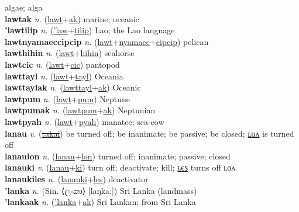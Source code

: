 algae; alga \label{lawtalkas} \\
\textbf{lawtak} \textit{n.} (\hyperref[lawt]{lawt}+\hyperref[ak]{ak})
marine; oceanic \label{lawtak} \\
\textbf{'lawtilip} \textit{n.} (\hyperref['law]{'law}+\hyperref[tilip]{tilip})
Lao; the Lao language \label{'lawtilip} \\
\textbf{lawtnyamaeccipcip} \textit{n.} (\hyperref[lawt]{lawt}+\hyperref[nyamaec]{nyamaec}+\hyperref[cipcip]{cipcip})
pelican \label{lawtnyamaeccipcip} \\
\textbf{lawthihin} \textit{n.} (\hyperref[lawt]{lawt}+\hyperref[hihin]{hihin})
seahorse \label{lawthihin} \\
\textbf{lawtcic} \textit{n.} (\hyperref[lawt]{lawt}+\hyperref[cic]{cic})
pantopod \label{lawtcic} \\
\textbf{lawttayl} \textit{n.} (\hyperref[lawt]{lawt}+\hyperref[tayl]{tayl})
Oceania \label{lawttayl} \\
\textbf{lawttaylak} \textit{n.} (\hyperref[lawttayl]{lawttayl}+\hyperref[ak]{ak})
Oceanic \label{lawttaylak} \\
\textbf{lawtpum} \textit{n.} (\hyperref[lawt]{lawt}+\hyperref[pum]{pum})
Neptune \label{lawtpum} \\
\textbf{lawtpumak} \textit{n.} (\hyperref[lawtpum]{lawtpum}+\hyperref[ak]{ak})
Neptunian \label{lawtpumak} \\
\textbf{lawtpyah} \textit{n.} (\hyperref[lawt]{lawt}+\hyperref[pyah]{pyah})
manatee; sea-cow \label{lawtpyah} \\
\textbf{lanau} \textit{v.} (\hyperref[takai]{\sout{takai}})
be turned off; be inanimate; be passive; be closed; \hyperref[lanaulon]{ʟᴏᴧ} is turned off \label{lanau} \\
\textbf{lanaulon} \textit{n.} (\hyperref[lanau]{lanau}+\hyperref[lon]{lon})
turned off; inanimate; passive; closed \label{lanaulon} \\
\textbf{lanauki} \textit{v.} (\hyperref[lanau]{lanau}+\hyperref[ki]{ki})
turn off; deactivate; kill; \hyperref[lanaukiles]{ʟєꜱ} turns off ʟᴏᴧ \label{lanauki} \\
\textbf{lanaukiles} \textit{n.} (\hyperref[lanauki]{lanauki}+\hyperref[les]{les})
deactivator \label{lanaukiles} \\
\textbf{'lanka} \textit{n.} (Sin. ⟨ලංකා⟩ [laŋkaː])
Sri Lanka (landmass) \label{'lanka} \\
\textbf{'lankaak} \textit{n.} (\hyperref['lanka]{'lanka}+\hyperref[ak]{ak})
Sri Lankan; from Sri Lanka \label{'lankaak} \\
